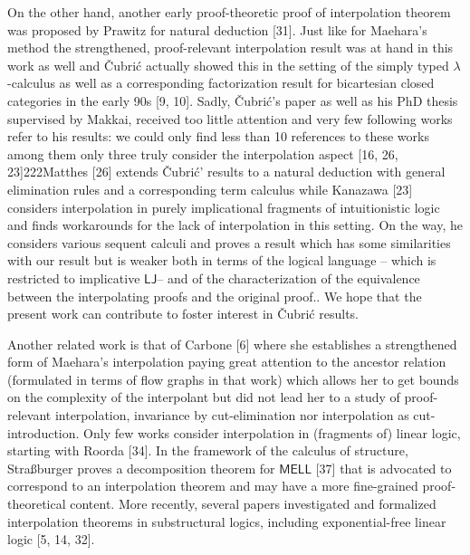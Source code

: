 On the other hand, another early proof-theoretic proof of interpolation theorem was proposed by Prawitz for natural deduction [31]. Just like for Maehara’s method the strengthened, proof-relevant interpolation result was at hand in this work as well and Čubrić actually showed this in the setting of the simply typed $\lambda$-calculus as well as a corresponding factorization result for bicartesian closed categories in the early 90s [9, 10]. Sadly, Čubrić’s paper as well as his PhD thesis supervised by Makkai, received too little attention and very few following works refer to his results: we could only find less than 10 references to these works among them only three truly consider the interpolation aspect [16, 26, 23]222Matthes [26] extends Čubrić’ results to a natural deduction with general elimination rules and a corresponding term calculus while Kanazawa [23] considers interpolation in purely implicational fragments of intuitionistic logic and finds workarounds for the lack of interpolation in this setting. On the way, he considers various sequent calculi and proves a result which has some similarities with our result but is weaker both in terms of the logical language – which is restricted to implicative $\mathsf{LJ}$– and of the characterization of the equivalence between the interpolating proofs and the original proof.. We hope that the present work can contribute to foster interest in Čubrić results.\par
 
 
 
Another related work is that of Carbone [6] where she establishes a strengthened form of Maehara’s interpolation paying great attention to the ancestor relation (formulated in terms of flow graphs in that work) which allows her to get bounds on the complexity of the interpolant but did not lead her to a study of proof-relevant interpolation, invariance by cut-elimination nor interpolation as cut-introduction. Only few works consider interpolation in (fragments of) linear logic, starting with Roorda [34]. In the framework of the calculus of structure, Straßburger proves a decomposition theorem for $\mathsf{MELL}$ [37] that is advocated to correspond to an interpolation theorem and may have a more fine-grained proof-theoretical content. More recently, several papers investigated and formalized interpolation theorems in substructural logics, including exponential-free linear logic [5, 14, 32].\par
 
